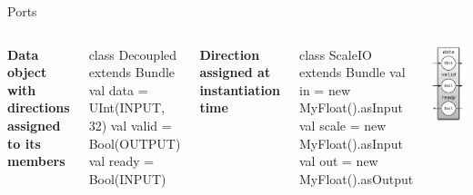 \documentclass[xcolor=pdflatex,dvipsnames,table]{beamer}
\begin{document}
\begin{frame}[fragile]{Ports}

\begin{columns}

\textbf{Data object with directions assigned to its members}

\begin{scala}
class Decoupled extends Bundle {
  val data  = UInt(INPUT, 32)
  val valid = Bool(OUTPUT)
  val ready = Bool(INPUT)
}
\end{scala}

\textbf{Direction assigned at instantiation time}

\begin{scala}
class ScaleIO extends Bundle {
  val in    = new MyFloat().asInput
  val scale = new MyFloat().asInput
  val out   = new MyFloat().asOutput
}
\end{scala}


\begin{center}
\includegraphics[height=0.9\textheight]{../cs250/figs/fifoio.pdf} 
\end{center}

\end{columns}

\end{frame}
\end{document}
